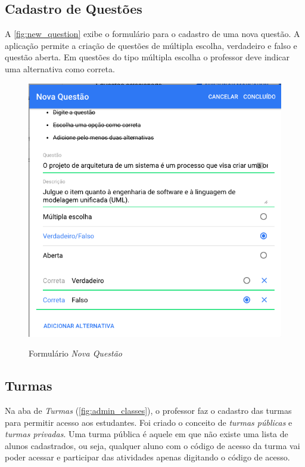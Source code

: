 \subsection{Cadastro de Questões}

A \autoref{fig:new_question} exibe o formulário para o cadastro de uma nova questão.
A aplicação permite a criação de questões de múltipla escolha, verdadeiro e falso e questão aberta.
Em questões do tipo múltipla escolha o professor deve indicar uma alternativa como correta.

\begin{figure}[ht]
  \centering
  \caption{Formulário \textit{Nova Questão}}
  \includegraphics[scale=.5]{imagens/telas/new_question}
  \doautor
  \label{fig:new_question}
\end{figure}

\subsection{Turmas}
\label{subsection:turmas}

Na aba de \textit{Turmas} (\autoref{fig:admin_classes}), o professor faz o cadastro das turmas
para permitir acesso aos estudantes. Foi criado o conceito de \textit{turmas públicas}
e \textit{turmas privadas}. Uma turma pública é aquele em que não existe uma
lista de alunos cadastrados, ou seja, qualquer aluno com o código de acesso da turma
vai poder acessar e participar das atividades apenas digitando o código de acesso.

